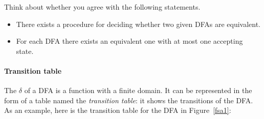 \begin{exercise}
Think about whether you agree with the following statements.

\begin{itemize}
\item There exists a procedure for deciding whether two given DFAs
  are equivalent.

\item For each DFA there exists an equivalent one with at most one accepting
state.

\end{itemize}
\end{exercise}

\paragraph{Transition table} The $\delta$ of a DFA is a function with a finite domain. It can be
represented in the form of a table named the {\em transition table}:
it shows the transitions of the DFA. As an example,
here is the transition table for the DFA in Figure~\ref{fsa1}:
